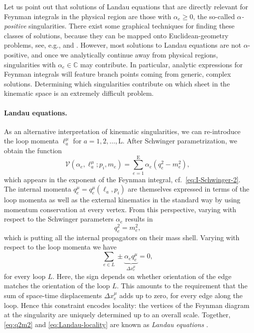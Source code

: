 \documentclass[12pt]{article}
\numberwithin{figure}{section}
\def \be {\begin{equation}}
\def \ee {\end{equation}}
\def \C {\mathbb{C}}
\def \E {\mathrm{E}}
\def \L {\mathrm{L}}
\def \V {\mathcal{V}}
\def \geq {\geqslant}
\begin{document}
    Let us point out that solutions of Landau equations that are directly relevant for Feynman integrals in the physical region are those with $\alpha_e \geq 0$, the so-called \emph{$\alpha$-positive} singularities. There exist some graphical techniques for finding these classes of solutions, because they can be mapped onto Euclidean-geometry problems, see, e.g., \cite[Ch.~18]{Bjorken:100770} and \cite{Bjorken:1959fd,Eden:1966dnq,todorov2014analytic,Correia:2021etg}.
    However, most solutions to Landau equations are not $\alpha$-positive, and once we analytically continue away from physical regions, singularities with $\alpha_e \in \C$ may contribute. In particular, analytic expressions for Feynman integrals will feature branch points coming from generic, complex solutions. Determining which singularities contribute on which sheet in the kinematic space is an extremely difficult problem.
    
    \paragraph{Landau equations.}
    As an alternative interpretation of kinematic singularities, we can re-introduce the loop momenta $\ell_a^\mu$ for $a=1,2,\ldots,\L$. After Schwinger parametrization, we obtain the function
    \be\label{eq:V-alpha-ell}
    \V(\alpha_e, \ell_a^\mu; p_i, m_e) = \sum_{e=1}^{\E} \alpha_e (q_e^2 - m_e^2),
    \ee
    which appears in the exponent of the Feynman integral, cf.~\eqref{eq:I-Schwinger-2}.
    The internal momenta $q_e^\mu = q_e^\mu(\ell_a,p_i)$ are themselves expressed in terms of the loop momenta as well as the external kinematics in the standard way by using momentum conservation at every vertex. From this perspective, varying with respect to the Schwinger parameters $\alpha_e$ results in
    \be\label{eq:q2m2}
    q_e^2 = m_e^2,
    \ee
    which is putting all the internal propagators on their mass shell. Varying with respect to the loop momenta we have
    \be\label{eq:Landau-locality}
    \sum_{e \in L} \pm\underbrace{\alpha_e q_e^\mu}_{\Delta x_e^\mu} = 0,
    \ee
    for every loop $L$. Here, the sign depends on whether orientation of the edge matches the orientation of the loop $L$. This amounts to the requirement that the sum of space-time displacements $\Delta x_e^\mu$ adds up to zero, for every edge along the loop. Hence this constraint encodes locality: the vertices of the Feynman diagram at the singularity are uniquely determined up to an overall scale. Together, \eqref{eq:q2m2} and \eqref{eq:Landau-locality} are known as \emph{Landau equations} \cite{Bjorken:1959fd,Landau:1959fi,10.1143/PTP.22.128}.
\end{document}
